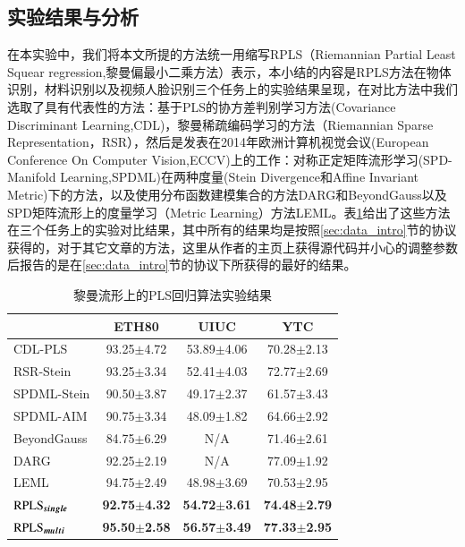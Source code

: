\subsection{实验结果与分析}
\label{sec:RPLS_exp_result_analysis}
在本实验中，我们将本文所提的方法统一用缩写RPLS（Riemannian Partial Least Squear regression,黎曼偏最小二乘方法）表示，本小结的内容是RPLS方法在物体识别，材料识别以及视频人脸识别三个任务上的实验结果呈现，在对比方法中我们选取了具有代表性的方法：基于PLS的协方差判别学习方法(Covariance Discriminant Learning,CDL)\cite{Statistics_CDL}，黎曼稀疏编码学习的方法（Riemannian Sparse Representation，RSR），然后是发表在2014年欧洲计算机视觉会议(European Conference On Computer Vision,ECCV)上的工作：对称正定矩阵流形学习(SPD-Manifold Learning,SPDML)在两种度量(Stein Divergence\cite{Stein_divergence}和Affine Invariant Metric\cite{AIM_metric})下的方法，以及使用分布函数建模集合的方法DARG\cite{Statistics_DARG}和BeyondGauss\cite{Statistics_BeyondGauss}以及SPD矩阵流形上的度量学习（Metric Learning）方法LEML\cite{Statistics_LEML}。表\ref{tab:RPLS_experiment}给出了这些方法在三个任务上的实验对比结果，其中所有的结果均是按照\ref{sec:data_intro}节的协议获得的，对于其它文章的方法，这里从作者的主页上获得源代码并小心的调整参数后报告的是在\ref{sec:data_intro}节的协议下所获得的最好的结果。
\begin{table}[htb]
	\centering
	\caption{黎曼流形上的PLS回归算法实验结果}
	\begin{tabular*}{\linewidth}{@{\extracolsep{\fill}}|l|ccc|}\hline
		\diagbox{方法}{数据集} &ETH80 &UIUC &YTC \\ \hline
		CDL-PLS\cite{Statistics_CDL} &93.25$\pm$4.72 &53.89$\pm$4.06 &70.28$\pm$2.13 \\ \hline
		RSR-Stein\cite{Dictionary_RSR} &93.25$\pm$3.34 &52.41$\pm$4.03 &72.77$\pm$2.69  \\ \hline
		SPDML-Stein\cite{Statistics_SPDML} &90.50$\pm$3.87 &49.17$\pm$2.37 &61.57$\pm$3.43  \\ \hline
		SPDML-AIM\cite{Statistics_SPDML} &90.75$\pm$3.34 &48.09$\pm$1.82 &64.66$\pm$2.92  \\ \hline
		BeyondGauss\cite{Statistics_BeyondGauss} &84.75$\pm$6.29 &N/A &71.46$\pm$2.61  \\ \hline
		DARG\cite{Statistics_DARG} &92.25$\pm$2.19 &N/A &77.09$\pm$1.92  \\ \hline
		LEML\cite{Statistics_LEML}&94.75$\pm$2.49 &48.98$\pm$3.69 &70.53$\pm$2.95  \\ \hline
		$\rm \bm{RPLS_{single}}$ &\textbf{92.75$\pm$4.32} &\textbf{54.72$\pm$3.61} &\textbf{74.48$\pm$2.79}  \\ \hline
		$\rm \bm{RPLS_{multi}}$ &\textbf{95.50$\pm$2.58} &\textbf{56.57$\pm$3.49} &\textbf{77.33$\pm$2.95}  \\ \hline
	\end{tabular*}
	\label{tab:RPLS_experiment}
\end{table}

